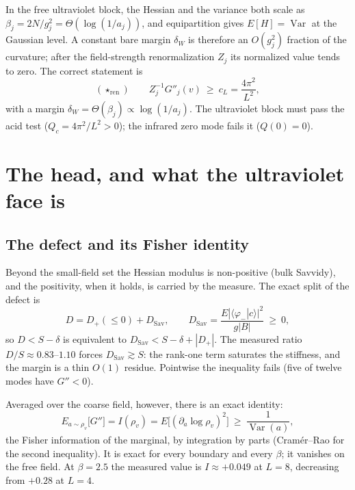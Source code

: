 \documentclass[11pt,a4paper]{article}
\begin{document}
In the free ultraviolet block, the Hessian and the variance both scale as
$\beta_j=2N/g_j^2=\Theta(\log(1/a_j))$, and equipartition gives $E[H]=\operatorname{Var}$ at the
Gaussian level. A constant bare margin $\delta_W$ is therefore an $O(g_j^2)$ fraction of the
curvature; after the field-strength renormalization $Z_j$ its normalized value tends to zero. The
correct statement is
\begin{equation}
(\star_{\mathrm{ren}})\qquad Z_j^{-1}G''_j(v)\ \ge\ c_L=\frac{4\pi^2}{L^2},
\label{eq:ren}
\end{equation}
with a margin $\delta_W=\Theta(\beta_j)\propto\log(1/a_j)$. The ultraviolet block must pass the acid
test ($Q_c=4\pi^2/L^2>0$); the infrared zero mode fails it ($Q(0)=0$).

\section{The head, and what the ultraviolet face is}
\label{sec:head}

\subsection{The defect and its Fisher identity}
\label{sec:defect}

Beyond the small-field set the Hessian modulus is non-positive (bulk Savvidy), and the positivity,
when it holds, is carried by the measure. The exact split of the defect is
\begin{equation}
D=D_+(\le0)+D_{\mathrm{Sav}},\qquad
D_{\mathrm{Sav}}=\frac{E|\langle\varphi_-|c\rangle|^2}{g|B|}\ \ge\ 0 ,
\label{eq:dsplit}
\end{equation}
so $D<S-\delta$ is equivalent to
$D_{\mathrm{Sav}}<S-\delta+|D_+|$. The measured ratio $D/S\approx0.83$--$1.10$ forces
$D_{\mathrm{Sav}}\gtrsim S$: the rank-one term saturates the stiffness, and the margin is a thin
$O(1)$ residue. Pointwise the inequality fails (five of twelve modes have $G''<0$).

Averaged over the coarse field, however, there is an exact identity:
\begin{equation}
E_{a\sim\rho_v}\bigl[G''\bigr]=I(\rho_v)=E\bigl[(\partial_a\log\rho_v)^2\bigr]\ \ge\ \frac{1}{\operatorname{Var}(a)},
\label{eq:fisher}
\end{equation}
the Fisher information of the marginal, by integration by parts (Cram\'er--Rao for the second
inequality). It is exact for every boundary and every $\beta$; it vanishes on the free field. At
$\beta=2.5$ the measured value is $I\approx+0.049$ at $L=8$, decreasing from $+0.28$ at $L=4$.
\end{document}
